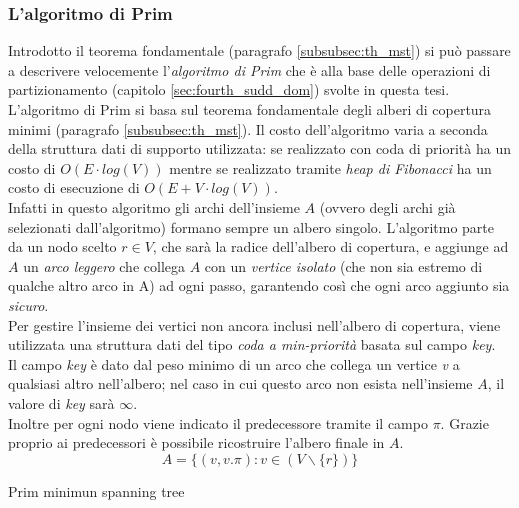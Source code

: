 \subsubsection{L'algoritmo di Prim}
Introdotto il teorema fondamentale (paragrafo \ref{subsubsec:th_mst}) si può passare a descrivere velocemente l'\emph{algoritmo di Prim} che è alla base delle operazioni di partizionamento (capitolo \ref{sec:fourth_sudd_dom}) svolte in questa tesi.\\
L’algoritmo di Prim si basa sul teorema fondamentale degli alberi di copertura minimi (paragrafo \ref{subsubsec:th_mst}). Il costo dell'algoritmo varia a seconda della struttura dati di supporto utilizzata: se realizzato con coda di priorità ha un costo di $O(E\cdot log(V))$ mentre se realizzato tramite \textit{heap di Fibonacci} ha un costo di esecuzione di $O(E+V\cdot log(V))$.\\
Infatti in questo algoritmo gli archi dell'insieme $A$ (ovvero degli archi già selezionati dall'algoritmo) formano sempre un albero singolo. L’algoritmo parte da un nodo scelto $r \in V$, che sarà la radice dell’albero di copertura, e aggiunge ad $A$ un \textit{arco leggero} che collega $A$ con un \textit{vertice isolato} (che non sia estremo di qualche altro arco in A) ad ogni passo, garantendo così che ogni arco aggiunto sia \textit{sicuro}.\\
Per gestire l’insieme dei vertici non ancora inclusi nell’albero di copertura, viene utilizzata una struttura dati del tipo \textit{coda a min-priorità} basata sul campo \textit{key}.\\
Il campo \textit{key} è dato dal peso minimo di un arco che collega un vertice \textit{v} a qualsiasi altro nell'albero; nel caso in cui questo arco non esista nell'insieme $A$, il valore di \textit{key} sarà $\infty$.\\
Inoltre per ogni nodo viene indicato il predecessore tramite il campo $\pi$. Grazie proprio ai predecessori è possibile ricostruire l'albero finale in $A$.
\begin{equation}
	A = \{(v, v.\pi) : v \in (V \backslash \{r\})\}
\end{equation}

\begin{algorithm}[H]
	\caption{Prim minimun spanning tree}
	\label{alg:Prim_Mst}
	\begin{algorithmic}[1]
		\Statex
		\\
		\EndFor
		\EndIf
		\EndFor
		\EndWhile
		\State \Return{}
		\EndFunction
	\end{algorithmic}
\end{algorithm}

